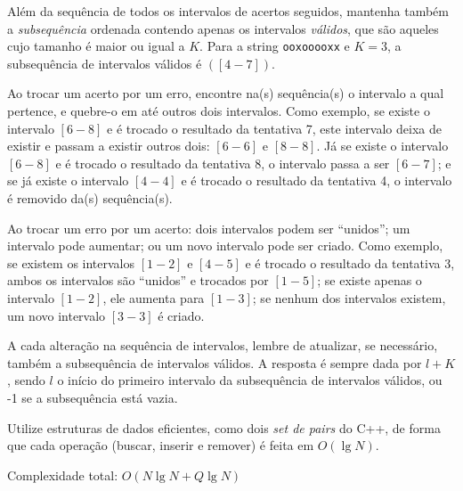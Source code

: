 Além da sequência de todos os intervalos de acertos seguidos, mantenha também a
\textit{subsequência} ordenada contendo
apenas os intervalos \textit{válidos}, que são aqueles cujo tamanho é maior ou
igual a $K$. Para a string \texttt{ooxooooxx} e $K=3$, a subsequência de intervalos válidos
é $([4-7])$.

Ao trocar um acerto por um erro, encontre na(s) sequência(s) o intervalo a qual
pertence, e quebre-o em até outros dois
intervalos. Como exemplo, se existe o intervalo $[6-8]$ e é trocado o resultado
da tentativa 7, este intervalo deixa de existir e passam a existir outros dois:
$[6-6]$ e $[8-8]$. Já se existe o intervalo $[6-8]$ e é trocado o resultado da
tentativa 8, o intervalo passa a ser $[6-7]$; e se já existe o intervalo $[4-4]$
e é trocado o resultado da tentativa 4, o intervalo é removido da(s)
sequência(s).

Ao trocar um erro por um acerto: dois intervalos podem ser ``unidos''; um
intervalo pode aumentar; ou um novo intervalo pode ser criado. Como exemplo, se
existem os intervalos $[1-2]$ e $[4-5]$ e é trocado o resultado da tentativa 3,
ambos os intervalos são ``unidos'' e trocados por $[1-5]$; se existe apenas o intervalo
$[1-2]$, ele aumenta para $[1-3]$; se nenhum dos intervalos existem, um novo
intervalo $[3-3]$ é criado.

A cada alteração na sequência de intervalos, lembre de atualizar, se necessário,
também a subsequência de intervalos válidos. A resposta é sempre dada por $l+K$,
sendo $l$ o início do primeiro
intervalo da subsequência de intervalos válidos, ou -1 se a subsequência está
vazia.

Utilize estruturas de dados eficientes, como dois \textit{set de pairs} do C++,
de forma que cada operação (buscar, inserir e remover) é feita em $O(\lg N)$.

Complexidade total: $O(N\lg N + Q\lg N)$

